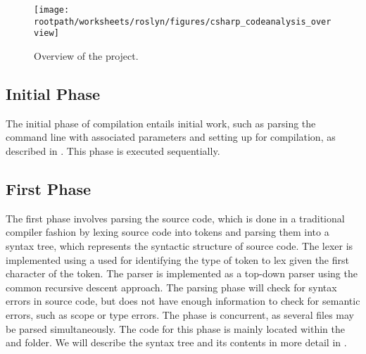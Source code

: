 \begin{figure}[htbp]
\centering
 \texttt{[image: \\rootpath/worksheets/roslyn/figures/csharp\_codeanalysis\_overview]} 
 \caption{Overview of the  project.}
\label{fig:roslyn_csharpanalysis_overview}
\end{figure}

\subsection{Initial Phase}
The initial phase of compilation entails initial work, such as parsing the command line with associated parameters and setting up for compilation, as described in . This phase is executed sequentially\cite{sadovRoslynPerf}.

\subsection{First Phase}
The first phase involves parsing the source code, which is done in a traditional compiler fashion by lexing source code into tokens and parsing them into a syntax tree, which represents the syntactic structure of source code. The lexer is implemented using a  used for identifying the type of token to lex given the first character of the token. The parser is implemented as a top-down parser using the common recursive descent approach. The parsing phase will check for syntax errors in source code, but does not have enough information to check for semantic errors, such as scope or type errors. The phase is concurrent, as several files may be parsed simultaneously\cite{sadovRoslynPerf}. The code for this phase is mainly located within the  and  folder. We will describe the syntax tree and its contents in more detail in .

